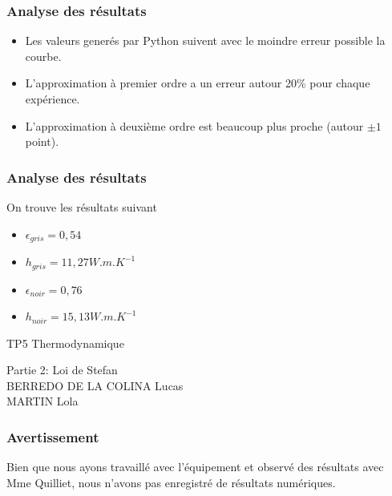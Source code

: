 \documentclass{beamer}
\begin{document}
\begin{frame}
\frametitle{Analyse des résultats}

\begin{itemize}
	\item{Les valeurs generés par Python suivent avec le moindre erreur possible la courbe.\newline}
	\item{L'approximation à premier ordre a un erreur autour 20\% pour chaque expérience.\newline}
	\item{L'approximation à deuxième ordre est beaucoup plus proche (autour $\pm1$ point).\newline}
\end{itemize}

\end{frame}


\begin{frame}
\frametitle{Analyse des résultats}
On trouve les résultats suivant
\begin{itemize}
	\item{$\epsilon_{gris}=0,54 $\newline}

	\item{$h_{gris}=11,27 W.m.K^{-1} $\newline}
    \item{$\epsilon_{noir}=0,76 $\newline}
    \item{$h_{noir}=15,13 W.m.K^{-1} $\newline}
\end{itemize}

\end{frame}




\begin{frame}

\Huge{TP5 Thermodynamique}

\Large{Partie 2: Loi de Stefan}
\\[2em]
\large{BERREDO DE LA COLINA Lucas\\ MARTIN Lola}

\end{frame}





\begin{frame}
\frametitle{Avertissement}
Bien que nous ayons travaillé avec l'équipement et observé des résultats avec Mme Quilliet, nous n'avons pas enregistré de résultats numériques.
\end{frame}
\end{document}
